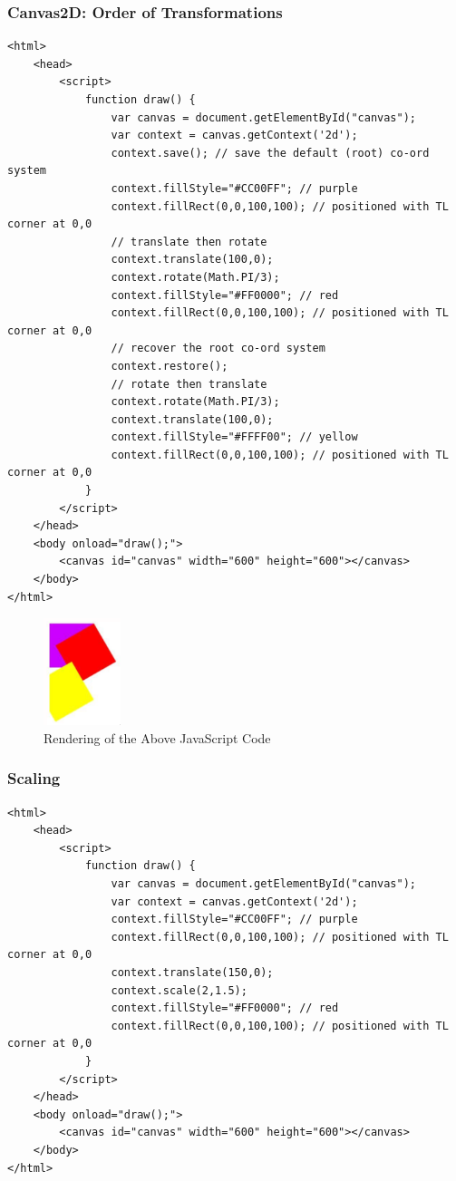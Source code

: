 \documentclass[a4paper,11pt]{article}
\begin{document}
\subsubsection{Canvas2D: Order of Transformations}
\begin{verbatim}
<html>
    <head>
        <script>
            function draw() {
                var canvas = document.getElementById("canvas");
                var context = canvas.getContext('2d');
                context.save(); // save the default (root) co-ord system
                context.fillStyle="#CC00FF"; // purple
                context.fillRect(0,0,100,100); // positioned with TL corner at 0,0
                // translate then rotate
                context.translate(100,0);
                context.rotate(Math.PI/3);
                context.fillStyle="#FF0000"; // red
                context.fillRect(0,0,100,100); // positioned with TL corner at 0,0
                // recover the root co-ord system
                context.restore();
                // rotate then translate
                context.rotate(Math.PI/3);
                context.translate(100,0);
                context.fillStyle="#FFFF00"; // yellow
                context.fillRect(0,0,100,100); // positioned with TL corner at 0,0
            }
        </script>
    </head>
    <body onload="draw();">
        <canvas id="canvas" width="600" height="600"></canvas>
    </body>
</html>
\end{verbatim}

\begin{figure}[H]
    \centering
    \includegraphics[width=0.2\textwidth]{images/canvas2d_order_of_transformations.png}
    \caption{Rendering of the Above JavaScript Code}
\end{figure}

\subsubsection{Scaling}
\begin{verbatim}
<html>
    <head>
        <script>
            function draw() {
                var canvas = document.getElementById("canvas");
                var context = canvas.getContext('2d');
                context.fillStyle="#CC00FF"; // purple
                context.fillRect(0,0,100,100); // positioned with TL corner at 0,0
                context.translate(150,0);
                context.scale(2,1.5);
                context.fillStyle="#FF0000"; // red
                context.fillRect(0,0,100,100); // positioned with TL corner at 0,0
            }
        </script>
    </head>
    <body onload="draw();">
        <canvas id="canvas" width="600" height="600"></canvas>
    </body>
</html>
\end{verbatim}
\end{document}
